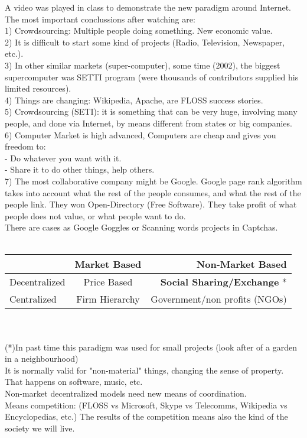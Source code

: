 A video was played in class to demonstrate the new paradigm around Internet. The most important conclussions after watching are:\\
1) Crowdsourcing: Multiple people doing something. New economic value.\\ 
2) It is difficult to start some kind of projects (Radio, Television, Newspaper, etc.).\\ 
3) In other similar markets (super-computer), some time (2002), the biggest supercomputer was SETTI program (were thousands of contributors supplied his limited resources).\\
4) Things are changing: Wikipedia, Apache, are FLOSS success stories.\\
5) Crowdsourcing (SETI): it is something that can be very huge, involving many people, and done via Internet, by means different from states or big companies.\\
6) Computer Market is high advanced, Computers are cheap and gives you freedom to:\\
- Do whatever you want with it.\\
- Share it to do other things, help others.\\
7) The most collaborative company might be Google. Google page rank algorithm takes into account what the rest of the people consumes, and what the rest of the people link. They won Open-Directory (Free Software). They take profit of what people does not value, or what people want to do.\\
There are cases as Google Goggles or Scanning words projects in Captchas.\\
\\
\begin{tabular}{| l | c | r |}
   \hline
   & Market Based & Non-Market Based \\
   \hline
   Decentralized  & Price Based    & \textbf{Social Sharing/Exchange} *\\
   \hline
   Centralized    & Firm Hierarchy & Government/non profits (NGOs) \\
   \hline
\end{tabular}
\\
\\
(*)In past time this paradigm was used for small projects (look after of a garden in a neighbourhood)\\
It is normally valid for "non-material" things, changing the sense of property. That happens on software, music, etc.\\
Non-market decentralized models need new means of coordination.\\
Means competition: (FLOSS vs Microsoft, Skype vs Telecomms, Wikipedia vs Encyclopedias, etc.)
The results of the competition means also the kind of the society we will live.



